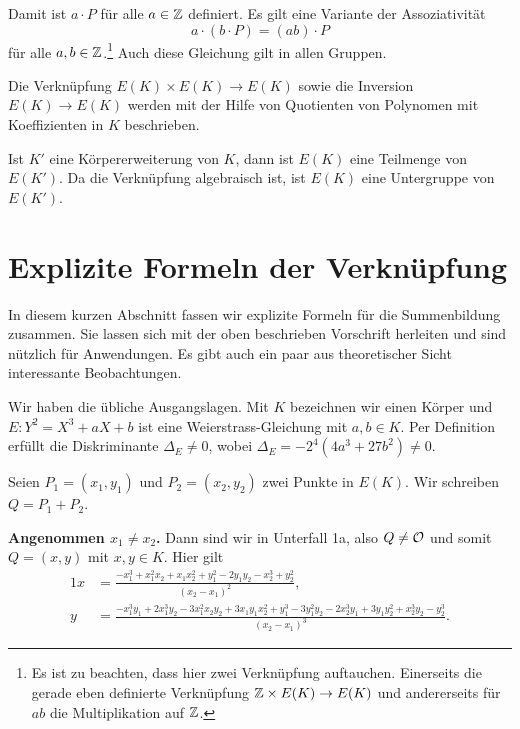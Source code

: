 Damit ist $a\cdot P$ für alle $a\in{\mathbb{Z}}$ definiert. Es gilt eine
Variante der Assoziativität
\begin{equation}
  \label{eq:actionofZ}
  a \cdot (b\cdot P) = (ab)\cdot P 
\end{equation}
für alle $a,b\in{\mathbb{Z}}$.\footnote{Es ist zu beachten, dass hier zwei
  Verknüpfung auftauchen. Einerseits die gerade eben definierte
  Verknüpfung ${\mathbb{Z}}\times E(K)\rightarrow E(K)$ und andererseits für
  $ab$ die
  Multiplikation auf ${\mathbb{Z}}$.} Auch diese Gleichung gilt in allen Gruppen.

\begin{bemerkung}
  Die Verknüpfung $E(K)\times
  E(K)\rightarrow E(K)$ sowie die Inversion $E(K)\rightarrow E(K)$
  werden mit der Hilfe von 
  Quotienten von Polynomen mit Koeffizienten in $K$ beschrieben.

  Ist $K'$ eine Körpererweiterung von $K$, dann ist $E(K)$ eine
  Teilmenge von $E(K')$. Da die Verknüpfung algebraisch ist, ist
  $E(K)$ eine Untergruppe von $E(K')$.
\end{bemerkung}

\section{Explizite Formeln der Verknüpfung}

In diesem kurzen Abschnitt fassen wir explizite Formeln für die
Summenbildung zusammen. Sie lassen sich mit der oben beschrieben
Vorschrift herleiten und sind nützlich für Anwendungen. Es gibt
auch ein paar aus theoretischer Sicht interessante Beobachtungen. 

Wir haben die übliche Ausgangslagen. Mit $K$ bezeichnen wir einen
Körper und $E: Y^2 = X^3+aX+b$ ist eine Weierstrass-Gleichung mit
$a,b\in K$. Per Definition erfüllt die Diskriminante $\Delta_E \not=
0$, wobei 
$\Delta_E=-2^4(4a^3+27b^2)\not=0$.

Seien $P_1 = (x_1,y_1)$ und $P_2 = (x_2,y_2)$ zwei Punkte in $E(K)$.
Wir schreiben $Q = P_1+P_2$. 

\bigskip
\textbf{Angenommen $x_1\not=x_2$.} Dann sind wir in Unterfall 1a, also
$Q\not={\mathcal O}$ und somit $Q = (x,y)$ mit $x,y\in K$. Hier gilt
\begin{alignat*}1
  x &= \frac{-x_1^3 + x_1^2x_2 + x_1x_2^2 + y_1^2 - 2y_1y_2 -x_2^3 +
    y_2^2}{(x_2-x_1)^2}, \\
  y &= \frac{-x_1^3 y_1 + 2x_1^3y_2 - 3x_1^2 x_2 y_2 + 3x_1y_1x_2^2 +
    y_1^3 - 3y_1^2y_2
     -2x_2^3y_1 + 3y_1 y_2^2 + x_2^3y_2 - y_2^3}{(x_2-x_1)^3}.
\end{alignat*}

